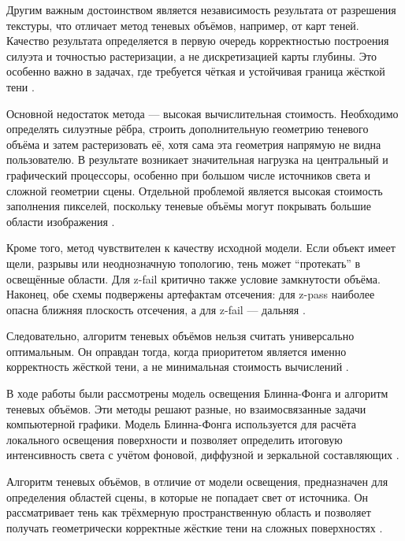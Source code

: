 \documentclass[a4paper, 12pt]{article}
\begin{document}
Другим важным достоинством является независимость результата от разрешения текстуры, что отличает метод теневых объёмов, например, от карт теней. Качество результата определяется в первую очередь корректностью построения силуэта и точностью растеризации, а не дискретизацией карты глубины. Это особенно важно в задачах, где требуется чёткая и устойчивая граница жёсткой тени \cite{stich2007}.

Основной недостаток метода --- высокая вычислительная стоимость. Необходимо определять силуэтные рёбра, строить дополнительную геометрию теневого объёма и затем растеризовать её, хотя сама эта геометрия напрямую не видна пользователю. В результате возникает значительная нагрузка на центральный и графический процессоры, особенно при большом числе источников света и сложной геометрии сцены. Отдельной проблемой является высокая стоимость заполнения пикселей, поскольку теневые объёмы могут покрывать большие области изображения \cite{mcguire2003,stich2007,mcguire2004}.

Кроме того, метод чувствителен к качеству исходной модели. Если объект имеет щели, разрывы или неоднозначную топологию, тень может ``протекать'' в освещённые области. Для z-fail критично также условие замкнутости объёма. Наконец, обе схемы подвержены артефактам отсечения: для z-pass наиболее опасна ближняя плоскость отсечения, а для z-fail --- дальняя \cite{everitt2002,stich2007,mcguire2004}.

Следовательно, алгоритм теневых объёмов нельзя считать универсально оптимальным. Он оправдан тогда, когда приоритетом является именно корректность жёсткой тени, а не минимальная стоимость вычислений \cite{mcguire2003,stich2007,mcguire2004}.

\newpage
{}

В ходе работы были рассмотрены модель освещения Блинна-Фонга и алгоритм теневых объёмов. Эти методы решают разные, но взаимосвязанные задачи компьютерной графики. Модель Блинна-Фонга используется для расчёта локального освещения поверхности и позволяет определить итоговую интенсивность света с учётом фоновой, диффузной и зеркальной составляющих \cite{book1,book2,book3}.

Алгоритм теневых объёмов, в отличие от модели освещения, предназначен для определения областей сцены, в которые не попадает свет от источника. Он рассматривает тень как трёхмерную пространственную область и позволяет получать геометрически корректные жёсткие тени на сложных поверхностях \cite{crow1977,heidmann1991,stich2007,mcguire2004}.
\end{document}
